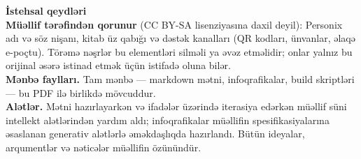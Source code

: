 \clearpage
\thispagestyle{empty}
\begin{flushleft}\small\sffamily
\textbf{İstehsal qeydləri}\\[1.2em]

\textbf{Müəllif tərəfindən qorunur} (CC BY-SA lisenziyasına daxil deyil):
Personix adı və söz nişanı, kitab üz qabığı və dəstək kanalları (QR
kodları, ünvanlar, əlaqə e-poçtu). Törəmə nəşrlər bu elementləri silməli
ya əvəz etməlidir; onlar yalnız bu orijinal əsərə istinad etmək üçün
istifadə oluna bilər.\\[1.2em]

\textbf{Mənbə faylları.} Tam mənbə --- markdown mətni, infoqrafikalar,
build skriptləri --- bu PDF ilə birlikdə mövcuddur.\\[1.2em]

\textbf{Alətlər.} Mətni hazırlayarkən və ifadələr üzərində iterasiya
edərkən müəllif süni intellekt alətlərindən yardım aldı; infoqrafikalar
müəllifin spesifikasiyalarına əsaslanan generativ alətlərlə əməkdaşlıqda
hazırlandı. Bütün ideyalar, arqumentlər və nəticələr müəllifin özünündür.
\end{flushleft}
\clearpage
